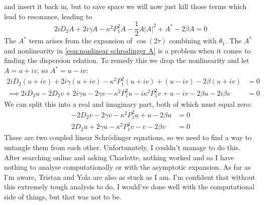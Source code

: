 \documentclass[11pt]{article}
\numberwithin{equation}{section}
\numberwithin{figure}{section}
\numberwithin{table}{section}
\begin{document}
and insert it back in, but to save space we will now just kill those terms which lead to resonance, leading to 
\begin{equation}
    2iD_2A+2i\gamma A-\kappa^2P_1^2A-\frac{1}{2}A|A|^2+A^*-2\beta A=0
    \label{eqn:nonlinear schrodinger A}
\end{equation}
The $A^*$ term arises from the expansion of $\cos(2\tau)$ combining with $\theta_1$. The $A^*$ and nonlinearity in \cref{eqn:nonlinear schrodinger A} is a problem when it comes to finding the dispersion relation. To remedy this we drop the nonlinearity and let $A=u+iv$, so $A^*=u-iv$:
\begin{align*}
    2iD_2(u+iv)+2i\gamma (u+iv)-\kappa^2P_1^2(u+iv)+(u-iv)-2\beta (u+iv)&=0\\
    \implies 2iD_2u-2D_2v+2i\gamma u-2\gamma v-\kappa^2P_1^2u-i\kappa^2P_1^2v+u-iv-2\beta u-2i\beta v&=0
\end{align*}
We can split this into a real and imaginary part, both of which must equal zero:
\begin{align*}
    -2D_2v-2\gamma v-\kappa^2P_1^2u+u-2\beta u&=0\\
    2D_2u+2\gamma u-\kappa^2P_1^2v-v-2\beta v&=0
\end{align*}
These are two coupled linear Schr\"odinger equations, so we need to find a way to untangle them from each other. Unfortunately, I couldn't manage to do this. After searching online and asking Charlotte, nothing worked and so I have nothing to analyse computationally or with the asymptotic expansion. As far as I'm aware, Tristan and Yola are also as stuck as I am. I'm confident that without this extremely tough analysis to do, I would've done well with the computational side of things, but that was not to be. 
\end{document}
